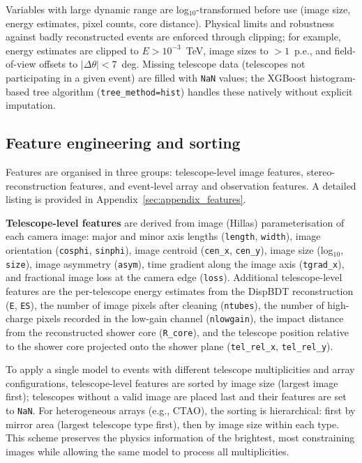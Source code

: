 \documentclass[12pt]{article}
\begin{document}
Variables with large dynamic range are log$_{10}$-transformed before use
(image size, energy estimates, pixel counts, core distance).
Physical limits and robustness against badly reconstructed events are
enforced through clipping; for example, energy estimates are clipped to
$E > 10^{-3}$~TeV, image sizes to $> 1$~p.e., and field-of-view offsets
to $|\Delta\theta| < 7$~deg.
Missing telescope data (telescopes not participating in a given event)
are filled with \texttt{NaN} values; the XGBoost
histogram-based tree algorithm (\texttt{tree\_method=hist}) handles
these natively without explicit imputation.

\subsection{Feature engineering and sorting}
\label{sec:features}

Features are organised in three groups: telescope-level image features,
stereo-reconstruction features, and event-level array and observation features.
A detailed listing is provided in Appendix~\ref{sec:appendix_features}.

\textbf{Telescope-level features} are derived from image (Hillas) parameterisation
of each camera image: major and minor axis lengths (\texttt{length}, \texttt{width}),
image orientation (\texttt{cosphi}, \texttt{sinphi}), image centroid
(\texttt{cen\_x}, \texttt{cen\_y}), image size (log$_{10}$, \texttt{size}),
image asymmetry (\texttt{asym}), time gradient along the image axis (\texttt{tgrad\_x}),
and fractional image loss at the camera edge (\texttt{loss}).
Additional telescope-level features are
the per-telescope energy estimates from the DispBDT reconstruction
(\texttt{E}, \texttt{ES}), the number of image pixels after cleaning (\texttt{ntubes}),
the number of high-charge pixels recorded in the low-gain channel (\texttt{nlowgain}),
the impact distance from the reconstructed shower core (\texttt{R\_core}),
and the telescope position relative to the shower core projected onto the shower plane
(\texttt{tel\_rel\_x}, \texttt{tel\_rel\_y}).

To apply a single model to events with different telescope multiplicities and
array configurations, telescope-level features are sorted by image size
(largest image first); telescopes without a valid image are placed last and
their features are set to \texttt{NaN}.
For heterogeneous arrays (e.g., CTAO), the sorting is hierarchical: first by
mirror area (largest telescope type first), then by image size within each type.
This scheme preserves the physics information of the brightest, most constraining
images while allowing the same model to process all multiplicities.
\end{document}
